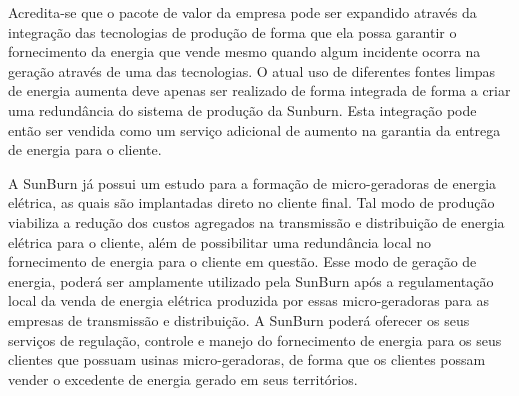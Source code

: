 Acredita-se que o pacote de valor da empresa pode ser expandido através da integração das tecnologias de produção de forma que ela possa garantir o fornecimento da energia que vende mesmo quando algum incidente ocorra na geração através de uma das tecnologias. O atual uso de diferentes fontes limpas de energia aumenta deve apenas ser realizado de forma integrada de forma a criar uma redundância do sistema de produção da Sunburn. Esta integração pode então ser vendida como um serviço adicional de aumento na garantia da entrega de energia para o cliente.

A SunBurn já possui um estudo para a formação de micro-geradoras de energia elétrica, as quais são implantadas direto no cliente final. Tal modo de produção viabiliza a redução dos custos agregados na transmissão e distribuição de energia elétrica para o cliente, além de possibilitar uma redundância local no fornecimento de energia para o cliente em questão. Esse modo de geração de energia, poderá ser amplamente utilizado pela SunBurn após a regulamentação local da venda de energia elétrica produzida por essas micro-geradoras para as empresas de transmissão e distribuição. A SunBurn poderá oferecer os seus serviços de regulação, controle e manejo do fornecimento de energia para os seus clientes que possuam usinas micro-geradoras, de forma que os clientes possam vender o excedente de energia gerado em seus territórios.



